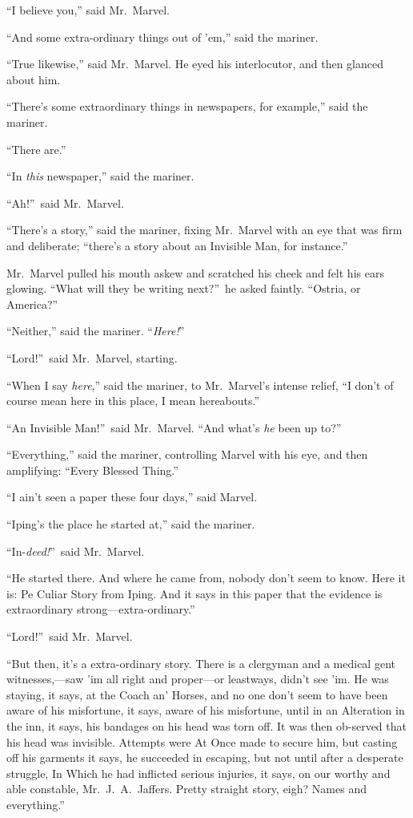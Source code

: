 “I believe you,” said Mr.\ Marvel.

“And some extra-ordinary things out of ’em,” said the mariner.

“True likewise,” said Mr.\ Marvel. He eyed his interlocutor, and then glanced about him.

“There’s some extraordinary things in newspapers, for example,” said the mariner.

“There are.”

“In \emph{this} newspaper,” said the mariner.

“Ah!”\ said Mr.\ Marvel.

“There’s a story,” said the mariner, fixing Mr.\ Marvel with an eye that was firm and deliberate; “there’s a story about an Invisible Man, for instance.”

Mr.\ Marvel pulled his mouth askew and scratched his cheek and felt his ears glowing. “What will they be writing next?”\ he asked faintly. “Ostria, or America?”

“Neither,” said the mariner. “\emph{Here!}”

“Lord!”\ said Mr.\ Marvel, starting.

“When I say \emph{here},” said the mariner, to Mr.\ Marvel’s intense relief, “I don’t of course mean here in this place, I mean hereabouts.”

“An Invisible Man!”\ said Mr.\ Marvel. “And what’s \emph{he} been up to?”

“Everything,” said the mariner, controlling Marvel with his eye, and then amplifying: “Every Blessed Thing.”

“I ain’t seen a paper these four days,” said Marvel.

“Iping’s the place he started at,” said the mariner.

“In-\emph{deed!}”\ said Mr.\ Marvel.

“He started there. And where he came from, nobody don’t seem to know. Here it is: Pe Culiar Story from Iping. And it says in this paper that the evidence is extraordinary strong—extra-ordinary.”

“Lord!”\ said Mr.\ Marvel.

“But then, it’s a extra-ordinary story. There is a clergyman and a medical gent witnesses,—saw ’im all right and proper—or leastways, didn’t see ’im. He was staying, it says, at the Coach an’ Horses, and no one don’t seem to have been aware of his misfortune, it says, aware of his misfortune, until in an Alteration in the inn, it says, his bandages on his head was torn off. It was then ob-served that his head was invisible. Attempts were At Once made to secure him, but casting off his garments it says, he succeeded in escaping, but not until after a desperate struggle, In Which he had inflicted serious injuries, it says, on our worthy and able constable, Mr.\ J.\ A.\ Jaffers. Pretty straight story, eigh? Names and everything.”

